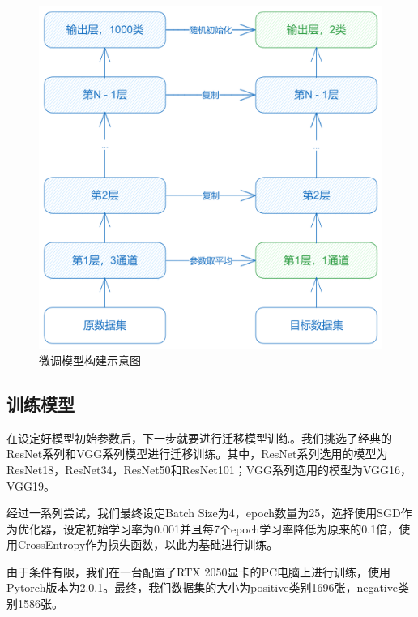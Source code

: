 \documentclass[12pt,a4paper]{article}%
\begin{document}
\begin{figure}[H]%
    \centering
    \begin{minipage}{0.65\textwidth}%
        \centering
        \includegraphics[width=1.0%
            \textwidth]{fine-tune.png}%
        \caption{\fontsize{10pt}{15pt}\selectfont 微调模型构建示意图}%
    \end{minipage}
\end{figure}

\subsection{训练模型}

在设定好模型初始参数后，下一步就要进行迁移模型训练。我们挑选了经典的ResNet系列和VGG系列模型进行迁移训练。其中，ResNet系列选用的模型为ResNet18，ResNet34，ResNet50和ResNet101；VGG系列选用的模型为VGG16，VGG19。

经过一系列尝试，我们最终设定Batch Size为4，epoch数量为25，选择使用SGD作为优化器，设定初始学习率为0.001并且每7个epoch学习率降低为原来的0.1倍，使用CrossEntropy作为损失函数，以此为基础进行训练。

由于条件有限，我们在一台配置了RTX 2050显卡的PC电脑上进行训练，使用Pytorch版本为2.0.1。最终，我们数据集的大小为positive类别1696张，negative类别1586张。
\end{document}
